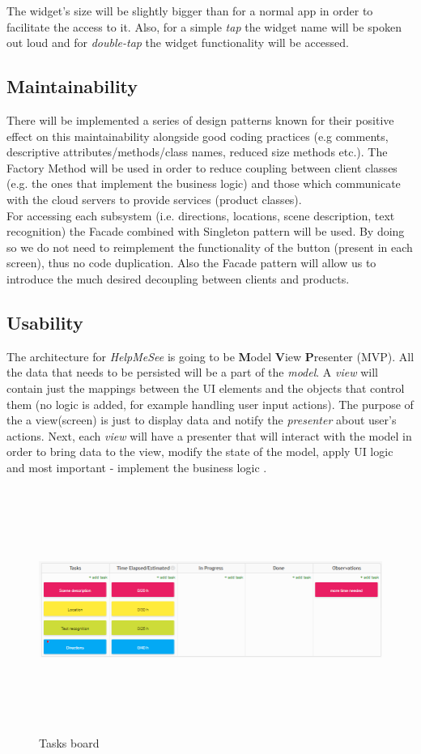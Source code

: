 \documentclass{article}[11]
\begin{document}
	The widget's size will be slightly bigger than for a normal app in order to facilitate the access to it. Also, for a simple \emph{tap} the widget name will be spoken out loud and for \emph{double-tap} the widget functionality will be accessed.

\subsection{Maintainability}
	There will be implemented a series of design patterns known for their  positive effect on this maintainability alongside good coding practices (e.g comments, descriptive attributes/methods/class names, reduced size methods etc.). The Factory Method will be used in order to reduce coupling between client classes (e.g. the ones that implement the business logic) and those which communicate with the cloud servers to provide services (product classes). \\
	
	For accessing each subsystem (i.e. directions, locations, scene description, text recognition) the Facade combined with Singleton pattern will be used. By doing so we do not need to reimplement the functionality of the  button (present in each screen), thus no code duplication. Also the Facade pattern will allow us to introduce the much desired decoupling between clients and products.
	
\subsection{Usability}
	The architecture for \emph{HelpMeSee} is going to be \textbf{M}odel \textbf{V}iew \textbf{P}resenter (MVP). All the data that needs to be persisted will be a part of the \emph{model}. A \emph{view} will contain just the mappings between the UI elements and the objects that control them (no logic is added, for example handling user input actions). The purpose of the a view(screen) is just to display data and notify the \emph{presenter} about user's actions. Next, each \emph{view} will have a presenter that will interact with the model in order to bring data to the view, modify the state of the model, apply UI logic and most important - implement the business logic .

 
\begin{figure}[H] 
	\includegraphics[width=16.5cm,height=8cm]{./imgs/taskSched}
	\caption{Tasks board}
\end{figure}
\end{document}
